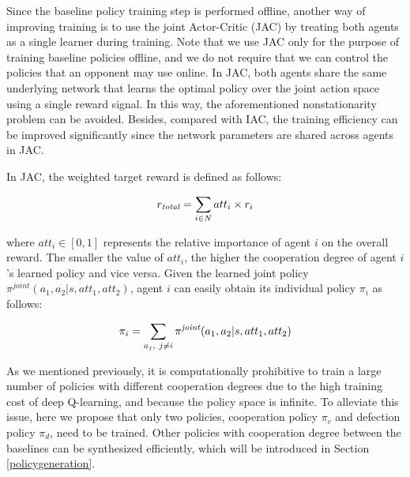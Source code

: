 \documentclass{article}
\begin{document}
Since the baseline policy training step is performed offline, another way of improving training is to use the joint Actor-Critic (JAC) by treating both agents as a single learner during training.
Note that we use JAC only for the purpose of training baseline policies offline,
and we do not require that we can control the policies that an opponent may use online.
In JAC, both agents share the same underlying network that learns the optimal policy over the joint action space using a single reward signal. In this way, the aforementioned nonstationarity problem can be avoided. Besides, compared with IAC, the training efficiency can be improved significantly since the network parameters are shared across agents in JAC.

In JAC, the weighted target reward is defined as follows:


\begin{eqnarray}
\label{attequation}
r_{ { \emph{total} } } = \sum_{i \in N} att_{i} \times r_i
\end{eqnarray}

where $att_i\in [0,1]$ represents the relative importance of agent $i$ on the overall reward. The smaller the value of $att_i$, the higher the cooperation degree of agent $i$'s learned policy and vice versa. Given the learned joint policy $\pi^{joint}(a_1,a_2|s,att_1,att_2)$, agent $i$ can easily obtain its individual policy $\pi_i$ as follows:


\begin{eqnarray}
\pi_i = \sum_{a_j,~j \neq i}\pi^{{\emph{joint}}}(a_1,a_2|s,att_1,att_2)
\end{eqnarray}

As we mentioned previously, it is computationally prohibitive to train a large number of policies with different cooperation degrees due to the high training cost of deep Q-learning, and because the policy space is infinite. To alleviate this issue, here we propose that only two policies, cooperation policy $\pi_c$ and defection policy $\pi_d$, need to be trained. Other policies with cooperation degree between the baselines can be synthesized efficiently, which will be introduced in Section \ref{policygeneration}.
\end{document}
